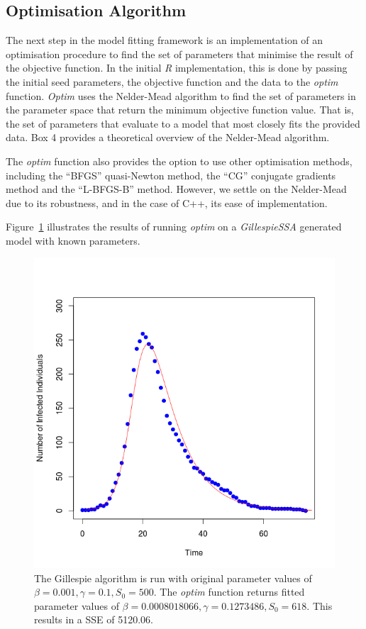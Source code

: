 \subsection{Optimisation Algorithm}
The next step in the model fitting framework is an implementation of
an optimisation procedure to find the set of parameters that minimise
the result of the objective function. In the initial \emph{R}
implementation, this is done by passing the initial seed parameters,
the objective function and the data to the \emph{optim}
function. \emph{Optim} uses the Nelder-Mead algorithm to find the set
of parameters in the parameter space that return the minimum objective
function value. That is, the set of parameters that evaluate to a
model that most closely fits the provided data. Box 4 provides a
theoretical overview of the Nelder-Mead algorithm. 

The \emph{optim} function also provides the option to use other optimisation methods,
including the ``BFGS'' quasi-Newton method, the ``CG'' conjugate
gradients method and the ``L-BFGS-B'' method. However, we settle on the
Nelder-Mead due to its robustness, and in the case of C++, its ease of
implementation. 

Figure~\ref{fig:simple}  illustrates the results of running \emph{optim} on a
\emph{GillespieSSA} generated model with known parameters.

\begin{centering}
\begin{figure}
\includegraphics[width=15cm]{simplefit.png}
\caption{The Gillespie algorithm is run with original parameter values of $\beta =
  0.001, \gamma = 0.1, S_0 = 500$. The \emph{optim} function returns
  fitted parameter values of $\beta = 0.0008018066, \gamma = 0.1273486, S_0
  = 618$. This results in a SSE of 5120.06.}
\label{fig:simple}
\end{figure}
\end{centering}



